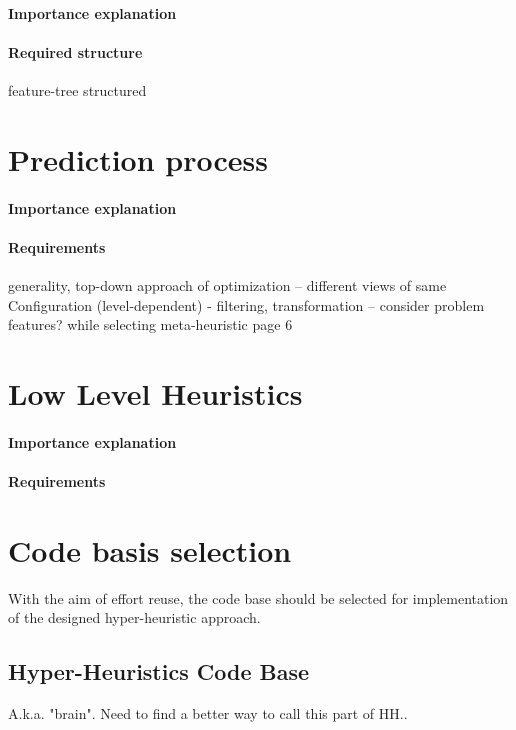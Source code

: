 \paragraph{Importance explanation}
\paragraph{Required structure} feature-tree structured



\section{Prediction process}\label{concept:prediction}
\paragraph{Importance explanation}
\paragraph{Requirements} generality, top-down approach of optimization
-- different views of same Configuration (level-dependent) - filtering, transformation
-- consider problem features? while selecting meta-heuristic \cite{surv:kerschke2019automated} page 6


\section{Low Level Heuristics}\label{concept:llh}
\paragraph{Importance explanation}
\paragraph{Requirements}



\section{Code basis selection}
With the aim of effort reuse, the code base should be selected for implementation of the designed hyper-heuristic approach.

\subsection{Hyper-Heuristics Code Base}\label{concept:hh code basis selection}
A.k.a. "brain". Need to find a better way to call this part of HH..
